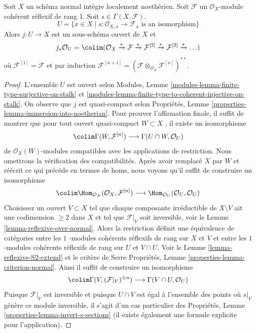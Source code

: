 \begin{lemma}
\label{lemma-structure-sheaf-Xs}
Soit  $X$  un schéma normal intègre localement noethérien. Soit
 $\mathcal{F}$  un  $\mathcal{O}_X$-module cohérent réflexif de rang 1. Soit
 $s \in \Gamma(X, \mathcal{F})$.
$$
U = \{x \in X \mid s : \mathcal{O}_{X, x} \to \mathcal{F}_x
\text{ is an isomorphism}\}
$$
Alors  $j : U \to X$  est un sous-schéma ouvert de  $X$  et
$$
j_*\mathcal{O}_U =
\colim (\mathcal{O}_X \xrightarrow{s} \mathcal{F}
\xrightarrow{s} \mathcal{F}^{[2]}
\xrightarrow{s} \mathcal{F}^{[3]}
\xrightarrow{s} \ldots)
$$
où  $\mathcal{F}^{[1]} = \mathcal{F}$  et par induction  $\mathcal{F}^{[n + 1]} =
(\mathcal{F} \otimes_{\mathcal{O}_X} \mathcal{F}^{[n]})^{**}$.
\end{lemma}

\begin{proof}
L'ensemble  $U$  est ouvert selon Modules, Lemme  \ref{modules-lemma-finite-type-surjective-on-stalk}  et
 \ref{modules-lemma-finite-type-to-coherent-injective-on-stalk}. On observe que  $j$  est quasi-compact selon Propriétés,
Lemme  \ref{properties-lemma-immersion-into-noetherian}. Pour prouver l'affirmation finale, il suffit de montrer que
pour tout ouvert quasi-compact  $W \subset X$ , il existe un isomorphisme
$$
\colim \Gamma(W, \mathcal{F}^{[n]})
\longrightarrow
\Gamma(U \cap W, \mathcal{O}_U)
$$
de  $\mathcal{O}_X(W)$-modules compatibles avec les applications de restriction. Nous
omettrons la vérification des compatibilités. Après avoir remplacé  $X$ 
par  $W$  et réécrit ce qui précède en termes de homs, nous voyons qu'il
suffit de construire un isomorphisme
$$
\colim \Hom_{\mathcal{O}_X}(\mathcal{O}_X, \mathcal{F}^{[n]})
\longrightarrow
\Hom_{\mathcal{O}_U}(\mathcal{O}_U, \mathcal{O}_U)
$$
Choisissez un ouvert  $V \subset X$  tel que chaque composante irréductible de
 $X \setminus V$  ait une codimension  $\geq 2$  dans  $X$  et tel que
 $\mathcal{F}|_V$  soit inversible, voir le Lemme  \ref{lemma-reflexive-over-normal}. Alors la restriction
définit une équivalence de catégories entre les  $1$ -modules cohérents
réflexifs de rang sur  $X$  et  $V$  et entre les
 $1$ -modules cohérents réflexifs de rang sur  $U$  et  $V \cap U$.
Voir le Lemme  \ref{lemma-reflexive-S2-extend}  et le critère de Serre Propriétés, Lemme  \ref{properties-lemma-criterion-normal}.
Ainsi il suffit de construire un isomorphisme
$$
\colim \Gamma(V, (\mathcal{F}|_V)^{\otimes n}) \longrightarrow
\Gamma(V \cap U, \mathcal{O}_U)
$$
Puisque  $\mathcal{F}|_V$  est inversible et puisque  $U \cap V$  est égal à l'ensemble
des points où  $s|_V$  génère ce module inversible, il s'agit d'un cas
particulier des Propriétés, Lemme  \ref{properties-lemma-invert-s-sections}  (il existe également une formule
explicite pour l'application).
\end{proof}

